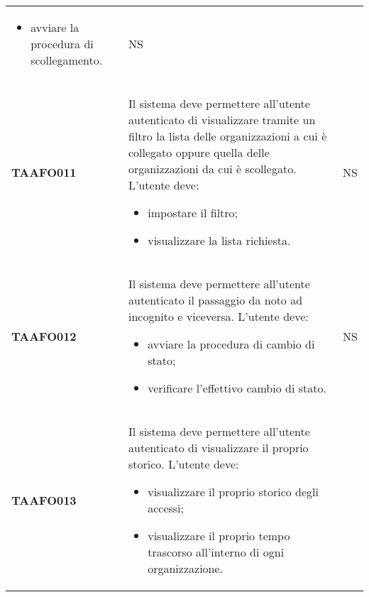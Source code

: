 \documentclass[../piano-di-qualifica.tex]{subfiles}
\begin{document}
\begin{longtable}[H]{>{\centering\bfseries}m{3cm} >{}m{11cm} >{\centering\arraybackslash}m{2cm}}
\begin{itemize}
    \item avviare la procedura di scollegamento.
  \end{itemize}
                                  & NS                                                                                                                                                                                                                                   \\
  TAAFO011                        & Il sistema deve permettere all’utente autenticato di visualizzare tramite un filtro la lista delle organizzazioni a cui è collegato oppure quella delle organizzazioni da cui è scollegato. \newline
  L’utente deve:
  \begin{itemize}
    \item impostare il filtro;
    \item visualizzare la lista richiesta.
  \end{itemize}
                                  & NS                                                                                                                                                                                                                                   \\
  TAAFO012                        & Il sistema deve permettere all’utente autenticato il passaggio da noto ad incognito e viceversa. \newline
  L’utente deve:
  \begin{itemize}
    \item avviare la procedura di cambio di stato;
    \item verificare l'effettivo cambio di stato.
  \end{itemize}
                                  & NS                                                                                                                                                                                                                                   \\
  TAAFO013                        & Il sistema deve permettere all’utente autenticato di visualizzare il proprio storico. \newline
  L’utente deve:
  \begin{itemize}
    \item visualizzare il proprio storico degli accessi;
    \item visualizzare il proprio tempo trascorso all'interno di ogni organizzazione.
  \end{itemize}

\end{longtable}
\end{document}
